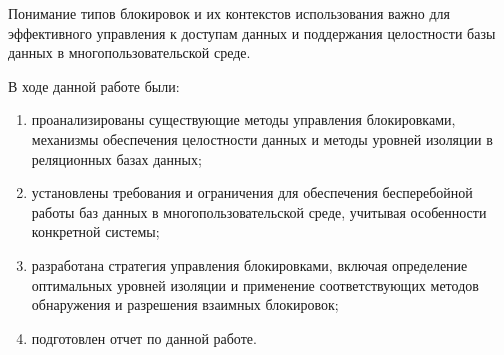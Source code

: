 Понимание типов блокировок и их контекстов использования важно для эффективного управления к доступам данных и поддержания целостности базы данных в многопользовательской среде.

В ходе данной работе были:

\begin{enumerate}[label={\arabic*)}]
	\item проанализированы существующие методы управления блокировками, механизмы обеспечения целостности данных и методы уровней изоляции в реляционных базах данных;
	\item установлены требования и ограничения для обеспечения бесперебойной работы баз данных в многопользовательской среде, учитывая особенности конкретной системы;
	\item разработана стратегия управления блокировками, включая определение оптимальных уровней изоляции и применение соответствующих методов обнаружения и разрешения взаимных блокировок;
	\item подготовлен отчет по данной работе.
\end{enumerate}
